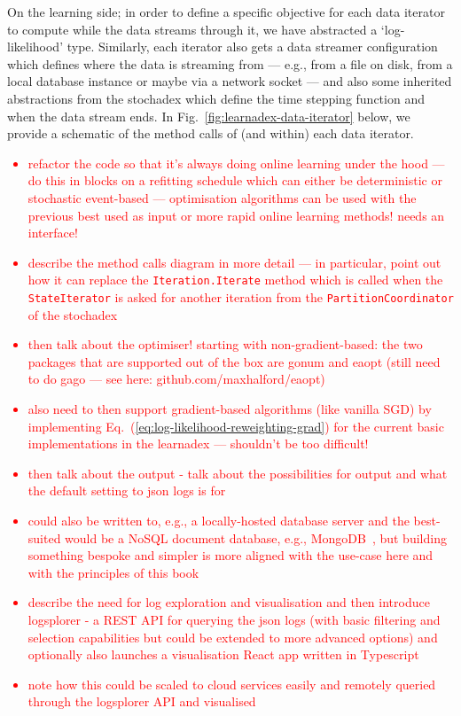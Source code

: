 On the learning side; in order to define a specific objective for each data iterator to compute while the data streams through it, we have abstracted a `log-likelihood' type. Similarly, each iterator also gets a data streamer configuration which defines where the data is streaming from --- e.g., from a file on disk, from a local database instance or maybe via a network socket --- and also some inherited abstractions from the stochadex which define the time stepping function and when the data stream ends. In Fig.~\ref{fig:learnadex-data-iterator} below, we provide a schematic of the method calls of (and within) each data iterator.

\textcolor{red}{\begin{itemize}
\item{refactor the code so that it's always doing online learning under the hood --- do this in blocks on a refitting schedule which can either be deterministic or stochastic event-based --- optimisation algorithms can be used with the previous best used as input or more rapid online learning methods! needs an interface!}
\item{describe the method calls diagram in more detail --- in particular, point out how it can replace the \texttt{Iteration.Iterate} method which is called when the \texttt{StateIterator} is asked for another iteration from the \texttt{PartitionCoordinator} of the stochadex}
\item{then talk about the optimiser! starting with non-gradient-based: the two packages that are supported out of the box are gonum and eaopt (still need to do gago --- see here: github.com/maxhalford/eaopt) }
\item{also need to then support gradient-based algorithms (like vanilla SGD) by implementing Eq.~(\ref{eq:log-likelihood-reweighting-grad}) for the current basic implementations in the learnadex --- shouldn't be too difficult!}
\item{then talk about the output - talk about the possibilities for output and what the default setting to json logs is for}
\item{could also be written to, e.g., a locally-hosted database server and the best-suited would be a NoSQL document database, e.g., MongoDB~\cite{mongodb}, but building something bespoke and simpler is more aligned with the use-case here and with the principles of this book}
\item{describe the need for log exploration and visualisation and then introduce logsplorer - a REST API for querying the json logs (with basic filtering and selection capabilities but could be extended to more advanced options) and optionally also launches a visualisation React app written in Typescript}
\item{note how this could be scaled to cloud services easily and remotely queried through the logsplorer API and visualised} 
\end{itemize}}

